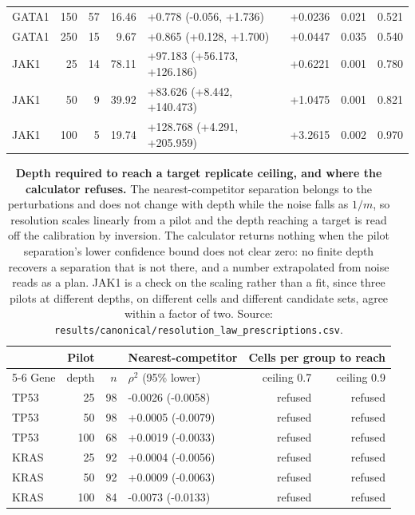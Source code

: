 \documentclass[11pt,letterpaper]{article}
\begin{document}
\begin{table}[H]
\begin{tabular}{@{}l r r r l r r r@{}}
GATA1 & 150 & 57 & 16.46 & +0.778 (-0.056, +1.736) & +0.0236 & 0.021 & 0.521 \\
GATA1 & 250 & 15 & 9.67 & +0.865 (+0.128, +1.700) & +0.0447 & 0.035 & 0.540 \\
JAK1 & 25 & 14 & 78.11 & +97.183 (+56.173, +126.186) & +0.6221 & 0.001 & 0.780 \\
JAK1 & 50 & 9 & 39.92 & +83.626 (+8.442, +140.473) & +1.0475 & 0.001 & 0.821 \\
JAK1 & 100 & 5 & 19.74 & +128.768 (+4.291, +205.959) & +3.2615 & 0.002 & 0.970 \\
\bottomrule
\end{tabular}
\end{table}

\begin{table}[H]
\centering
\caption{\textbf{Depth required to reach a target replicate ceiling, and where the calculator refuses.} The nearest-competitor separation belongs to the perturbations and does not change with depth while the noise falls as $1/m$, so resolution scales linearly from a pilot and the depth reaching a target is read off the calibration by inversion. The calculator returns nothing when the pilot separation's lower confidence bound does not clear zero: no finite depth recovers a separation that is not there, and a number extrapolated from noise reads as a plan. JAK1 is a check on the scaling rather than a fit, since three pilots at different depths, on different cells and different candidate sets, agree within a factor of two. Source: \texttt{results/canonical/resolution\_law\_prescriptions.csv}.}
\label{tab:depth}
\small
\begin{tabular}{@{}l r r l r r@{}}
\toprule
 & Pilot & & Nearest-competitor & \multicolumn{2}{c}{Cells per group to reach} \\
\cmidrule(l){5-6}
Gene & depth & $n$ & $\rho^2$ (95\% lower) & ceiling 0.7 & ceiling 0.9 \\
\midrule
TP53 & 25 & 98 & -0.0026 (-0.0058) & refused & refused \\
TP53 & 50 & 98 & +0.0005 (-0.0079) & refused & refused \\
TP53 & 100 & 68 & +0.0019 (-0.0033) & refused & refused \\
KRAS & 25 & 92 & +0.0004 (-0.0056) & refused & refused \\
KRAS & 50 & 92 & +0.0009 (-0.0063) & refused & refused \\
KRAS & 100 & 84 & -0.0073 (-0.0133) & refused & refused \\

\end{tabular}
\end{table}
\end{document}
